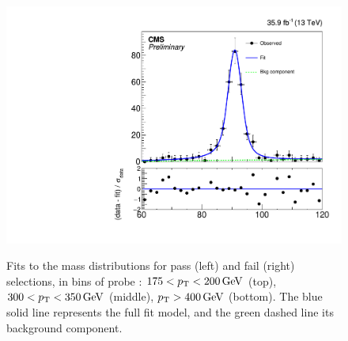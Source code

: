 \begin{figure}[htbp]
{    \includegraphics[]{Analysis/Figures/idsf/fit_data_fail_pt_300_350.pdf}
  }
  \caption{
    Fits to the mass distributions for pass (left) and fail (right) selections, in bins of probe \pt: 
    $175 < p_{\mathrm{T}} < 200\,\text{Ge\hspace{-.08em}V}$ (top), 
    $300 < p_{\mathrm{T}} < 350\,\text{Ge\hspace{-.08em}V}$ (middle), 
    $p_{\mathrm{T}} > 400\,\text{Ge\hspace{-.08em}V}$ (bottom). 
    The blue solid line represents the full fit model, and the green dashed line its background component.
  }
  \label{fig:idsf_fits}
\end{figure}

